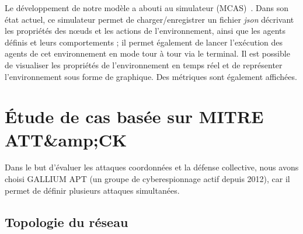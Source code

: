 Le développement de notre modèle a abouti au simulateur  (MCAS)~\cite{MCASWebsite}. Dans son état actuel, ce simulateur permet de charger/enregistrer un fichier \textit{json} décrivant les propriétés des nœuds et les actions de l'environnement, ainsi que les agents définis et leurs comportements ; il permet également de lancer l'exécution des agents de cet environnement en mode tour à tour via le terminal. Il est possible de visualiser les propriétés de l'environnement en temps réel et de représenter l'environnement sous forme de graphique. Des métriques sont également affichées.



\section{Étude de cas basée sur MITRE ATT\&amp;CK}


\noindent
Dans le but d'évaluer les attaques coordonnées et la défense collective, nous avons choisi GALLIUM APT (un groupe de cyberespionnage actif depuis 2012), car il permet de définir plusieurs attaques simultanées.


\subsection{Topologie du réseau}


